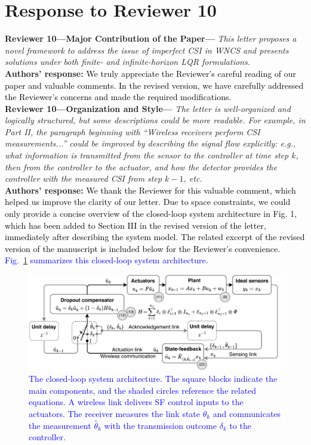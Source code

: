 \section{Response to Reviewer 10}
\textbf{Reviewer 10---Major Contribution of the Paper---}\textit{%
This letter proposes a novel framework to address the issue of imperfect CSI in WNCS and presents solutions under both finite- and infinite-horizon LQR formulations.}\\[2mm]
\textbf{Authors' response:} \textcolor{black}{We truly appreciate the Reviewer's careful reading of our paper and valuable comments. In the revised version, we have carefully addressed the Reviewer's concerns and made the required modifications.}\\[4mm]
\textbf{Reviewer 10---Organization and Style---}\textit{%
The letter is well-organized and logically structured, but some descriptions could be more readable.
For example, in Part II, the paragraph beginning with ``Wireless receivers perform CSI measurements...'' could be improved by describing the signal flow explicitly: e.g., what information is transmitted from the sensor to the controller at time step $k$, then from the controller to the actuator, and how the detector provides the controller with the measured CSI from step $k-1$, etc.}\\[2mm]
\textbf{Authors' response:} \textcolor{black}{We thank the Reviewer for this valuable comment, which helped us improve the clarity of our letter. Due to space constraints, we could only provide a concise overview of the closed-loop system architecture in Fig. 1, which has been added to Section III in the revised version of the letter, immediately after describing the system model. The related excerpt of the revised version of the manuscript is included below for the Reviewer's convenience.}\\
\textcolor{blue}{Fig.~\ref{fig:architecture} summarizes this closed-loop system architecture.}
\begin{figure}[h!]
\begin{center}
\includegraphics[width=0.8\columnwidth]{../wncs-lcss-cdc-25-architecture.pdf}
\caption{\textcolor{blue}{The closed-loop system architecture. The square blocks indicate the main components, and the shaded circles reference the related equations. A wireless link delivers SF control inputs to the actuators. The receiver measures the link state $\theta_k$ and communicates the measurement $\hat{\theta}_k$ with the transmission outcome $\delta_k$ to the controller. }}\label{fig:architecture}
\end{center}
\end{figure}\\[2mm]
